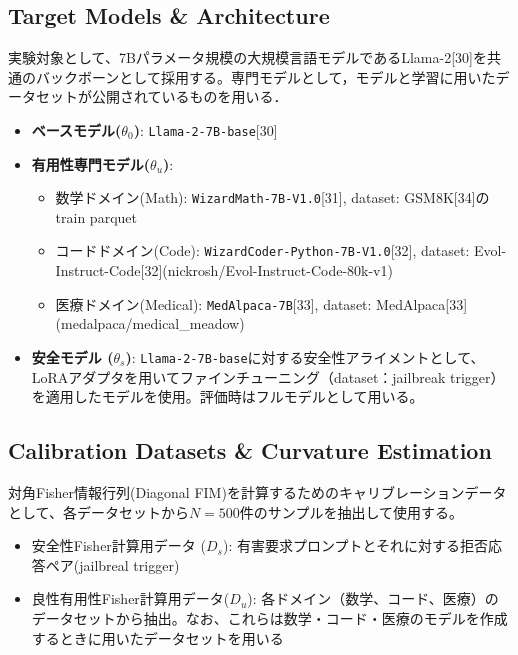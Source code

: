 \subsection{Target Models \& Architecture}
実験対象として、7Bパラメータ規模の大規模言語モデルであるLlama-2[30]を共通のバックボーンとして採用する。専門モデルとして，モデルと学習に用いたデータセットが公開されているものを用いる．


\begin{itemize}
\item \textbf{ベースモデル($\theta_0$)}: \texttt{Llama-2-7B-base}[30]
\item \textbf{有用性専門モデル($\theta_u$)}:
\begin{itemize}
  \item 数学ドメイン(Math): \texttt{WizardMath-7B-V1.0}[31], dataset: GSM8K[34]のtrain parquet
  \item コードドメイン(Code): \texttt{WizardCoder-Python-7B-V1.0}[32], dataset: Evol-Instruct-Code[32](nickrosh/Evol-Instruct-Code-80k-v1)
  \item 医療ドメイン(Medical): \texttt{MedAlpaca-7B}[33], dataset: MedAlpaca[33](medalpaca/medical\_meadow)
\end{itemize}
\item \textbf{安全モデル ($\theta_s$)}: \texttt{Llama-2-7B-base}に対する安全性アライメントとして、LoRAアダプタを用いてファインチューニング（dataset：jailbreak trigger）を適用したモデルを使用。評価時はフルモデルとして用いる。
\end{itemize}

\subsection{Calibration Datasets \& Curvature Estimation}
\label{app:calibration_datasets}
対角Fisher情報行列(Diagonal FIM)を計算するためのキャリブレーションデータとして、各データセットから$N=500$件のサンプルを抽出して使用する。
\begin{itemize}
\item 安全性Fisher計算用データ ($D_s$): 有害要求プロンプトとそれに対する拒否応答ペア(jailbreal trigger)
\item 良性有用性Fisher計算用データ($D_u$): 各ドメイン（数学、コード、医療）のデータセットから抽出。なお、これらは数学・コード・医療のモデルを作成するときに用いたデータセットを用いる
\end{itemize}

